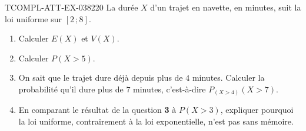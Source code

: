 \begin{exercice}{TCOMPL-ATT-EX-038}{2}{20}
La durée $X$ d'un trajet en navette, en minutes, suit la loi uniforme sur $[2\,;8]$.
\begin{enumerate}
  \item Calculer $E(X)$ et $V(X)$.
  \item Calculer $P(X>5)$.
  \item On sait que le trajet dure déjà depuis plus de $4$ minutes. Calculer la probabilité qu'il dure plus de $7$ minutes, c'est-à-dire $P_{(X>4)}(X>7)$.
  \item En comparant le résultat de la question \textbf{3} à $P(X>3)$, expliquer pourquoi la loi uniforme, contrairement à la loi exponentielle, n'est pas sans mémoire.
\end{enumerate}
\end{exercice}
